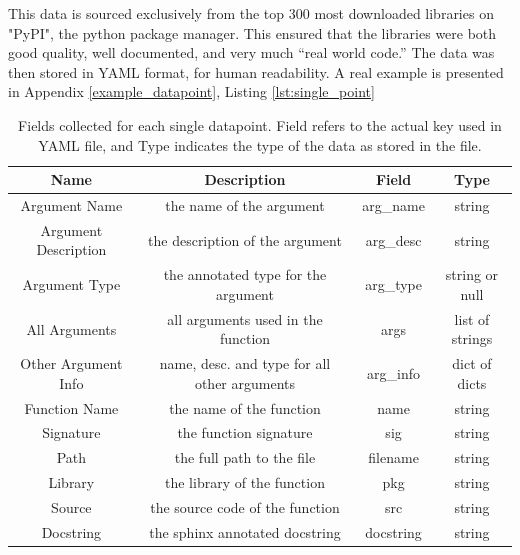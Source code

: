 This data is sourced exclusively from the top 300 most downloaded libraries on "PyPI", the python package manager. 
This ensured that the libraries were both good quality, well documented, and very much ``real world code.''
The data was then stored in YAML format, for human readability. 
A real example is presented in Appendix \ref{example_datapoint}, Listing \ref{lst:single_point}


\begin{table}[h!]
    \begin{center}
    \begin{tabular}{| c | c | c | c |}
        \hline
        Name &  Description     &    Field    & Type  \\
        \hline
        Argument Name & the name of the argument  & arg\_name & string \\
        Argument Description & the description of the argument & arg\_desc & string \\
        Argument Type & the annotated type for the argument & arg\_type & string or null \\
        All Arguments & all arguments used in the function & args & list of strings \\
        Other Argument Info & name, desc. and type for all other arguments & arg\_info & dict of dicts\\
        Function Name & the name of the function & name & string\\
        Signature & the function signature & sig & string\\
        Path & the full path to the file & filename & string \\
        Library & the library of the function & pkg & string\\
        Source & the source code of the function & src & string\\
        Docstring & the sphinx annotated docstring & docstring & string\\

        \hline


    \end{tabular}
    \caption {Fields collected for each single datapoint. Field refers to the actual key used in YAML file, and Type indicates the type of the data as stored in the file.}
    \label{table:metadata}
    \end{center}
\end{table}



